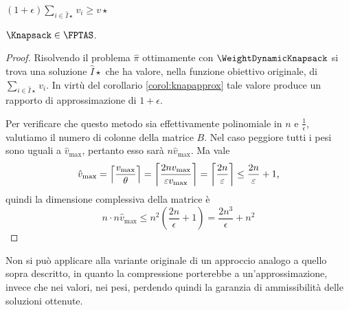 \begin{corollario}\label{corol:knapapprox}
	$\displaystyle(1+\epsilon)\sum_{i\in\hat I\star} v_i \geq v\star$
\end{corollario}

\begin{theorem}
	$\Knapsack\in\FPTAS$.
\end{theorem}
\begin{proof}
	Risolvendo il problema $\hat\pi$ ottimamente con $\WeightDynamicKnapsack$ si trova una soluzione $\hat I\star$ che ha valore, nella funzione obiettivo originale, di $\sum_{i\in\hat I\star} v_i$. In virtù del corollario \ref{corol:knapapprox} tale valore produce un rapporto di approssimazione di $1+\epsilon$.

	Per verificare che questo metodo sia effettivamente polinomiale in $n$ e $\frac{1}{\epsilon}$, valutiamo il numero di colonne della matrice $B$.
	Nel caso peggiore tutti i pesi sono uguali a $\hat v_{\max}$, pertanto esso sarà $n \hat v_{\max}$.
	Ma vale
	\begin{equation*}
		\hat v_{\max}=\left\lceil \frac{v_{\max}}{\theta} \right\rceil=\left\lceil \frac{2nv_{\max}}{\varepsilon v_{\max}} \right\rceil=\left\lceil \frac{2n}{\varepsilon} \right\rceil\leq\frac{2n}{\varepsilon}+1 \text,
	\end{equation*}
	quindi la dimensione complessiva della matrice è
	\begin{equation*}
		n\cdot n\hat v_{\max}\leq n^2\left(\frac{2n}{\epsilon}+1\right)=\frac{2n^3}{\epsilon}+n^2
	\end{equation*}
\end{proof}

Non si può applicare alla variante originale di \DynamicKnapsack un approccio analogo a quello sopra descritto, in quanto la compressione porterebbe a un'approssimazione, invece che nei valori, nei pesi, perdendo quindi la garanzia di ammissibilità delle soluzioni ottenute.
